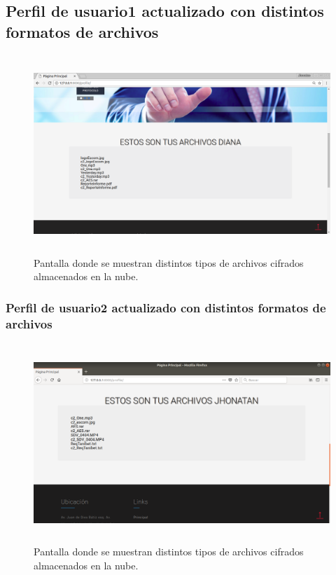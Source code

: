 \subsection{Perfil de usuario1 actualizado con distintos formatos de archivos}

			\begin{figure}[H]
			\centering
			\includegraphics[width=14cm, height=7.5cm]{./images/Implementacion/PerfilUsuarioActualizado.png}
			\caption{Pantalla donde se muestran distintos tipos de archivos cifrados almacenados en la nube.}
			\label{fig:6-1-27} 
			\end{figure}

\subsubsection{Perfil de usuario2 actualizado con distintos formatos de archivos}

			\begin{figure}[H]
			\centering
			\includegraphics[width=14cm, height=7.5cm]{./images/Implementacion/PerfilJhonaActualizado.png}
			\caption{Pantalla donde se muestran distintos tipos de archivos cifrados almacenados en la nube.}
			\label{fig:6-1-28} 
			\end{figure}

